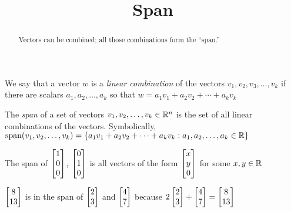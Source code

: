 \documentclass{ximera}
\title{Span}
\begin{document}
\begin{abstract}
  Vectors can be combined; all those combinations form the ``span.''
\end{abstract}
\maketitle

\begin{definition}
  We say that a vector $w$ is a \textit{linear combination} of the
  vectors $v_1,v_2,v_3,\dots,v_k$ if there are scalars
  $a_1,a_2,\dots,a_k$ so that $w = a_1v_1+a_2v_2+\cdots+a_kv_k$
\end{definition}
  		
\begin{definition}
  The \textit{span} of a set of vectors $v_1,v_2,\dots,v_k \in \mathbb R^n$ is the set of all linear combinations of the vectors.
  Symbolically, $\text{span}(v_1,v_2,\dots,v_k) = \{ a_1v_1+a_2v_2+\cdots+a_kv_k : a_1,a_2,\dots,a_k \in \mathbb R\}$
\end{definition}

\begin{example}
  The span of $\begin{bmatrix}1\\0\\0\end{bmatrix}$, $\begin{bmatrix}0\\1\\0\end{bmatrix}$ is all vectors of the form $\begin{bmatrix}x\\y\\0\end{bmatrix}$ for some $x,y \in \mathbb R$
\end{example}

\begin{example}
  $\begin{bmatrix}8\\13\end{bmatrix}$ is in the span of $\begin{bmatrix}2\\3\end{bmatrix}$ and $\begin{bmatrix}4\\7\end{bmatrix}$ because
  $2\begin{bmatrix}2\\3\end{bmatrix} + \begin{bmatrix}4\\7\end{bmatrix} = \begin{bmatrix}8\\13\end{bmatrix}$ 
\end{example}
\end{document}
